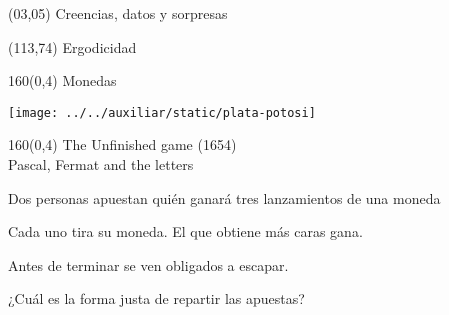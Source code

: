 \documentclass[shownotes,aspectratio=169]{beamer}
\begin{document}
\color{black!85}
\large

 

\begin{frame}
 
 \begin{textblock}{90}(03,05)
 \centering \huge  \textcolor{black!40}{Creencias, datos y sorpresas}
\end{textblock}

 \begin{textblock}{47}(113,74)
\centering \Large  \textcolor{white!55}{Ergodicidad}
\end{textblock}

{}
\end{frame}


\begin{frame}[plain]
 \begin{textblock}{160}(0,4)
  \centering \LARGE Monedas
 \end{textblock}

\vspace{1cm}

\texttt{[image: ../../auxiliar/static/plata-potosi]}
 
\end{frame}

\begin{frame}[plain]
 \begin{textblock}{160}(0,4)
  \centering \Large The Unfinished game (1654) \\ \normalsize Pascal, Fermat and the letters
 \end{textblock}
 \vspace{1cm}

Dos personas apuestan quién ganará tres lanzamientos de una moneda

\vspace{0.5cm}

Cada uno tira su moneda. El que obtiene más caras gana.

\vspace{0.5cm}

Antes de terminar se ven obligados a escapar. 

\vspace{0.5cm}

¿Cuál es la forma justa de repartir las apuestas?
 
\end{frame}
\end{document}
